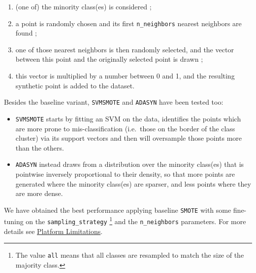 \documentclass[]{article}
\providecommand{\tightlist}{%
  \setlength{\itemsep}{0pt}\setlength{\parskip}{0pt}}
\begin{document}
\begin{enumerate}
\def\labelenumi{\arabic{enumi}.}
\tightlist
\item
  (one of) the minority class(es) is considered ;
\item
  a point is randomly chosen and its first \texttt{n\_neighbors} nearest
  neighbors are found ;
\item
  one of those nearest neighbors is then randomly selected, and the
  vector between this point and the originally selected point is drawn ;
\item
  this vector is multiplied by a number between 0 and 1, and the
  resulting synthetic point is added to the dataset.
\end{enumerate}

Besides the baseline variant, \texttt{SVMSMOTE} and \texttt{ADASYN} have
been tested too:

\begin{itemize}
\tightlist
\item
  \texttt{SVMSMOTE} starts by fitting an SVM on the data, identifies the
  points which are more prone to mis-classification (i.e.~those on the
  border of the class cluster) via its support vectors and then will
  oversample those points more than the others.
\item
  \texttt{ADASYN} instead draws from a distribution over the minority
  class(es) that is pointwise inversely proportional to their density,
  so that more points are generated where the minority class(es) are
  sparser, and less points where they are more dense.
\end{itemize}

We have obtained the best performance applying baseline \texttt{SMOTE}
with some fine-tuning on the \texttt{sampling\_strategy} \footnote{The
  value \texttt{all} means that all classes are resampled to match the
  size of the majority class.} and the \texttt{n\_neighbors} parameters.
For more details see \protect\hyperlink{platform-limitations}{Platform
Limitations}.
\end{document}
